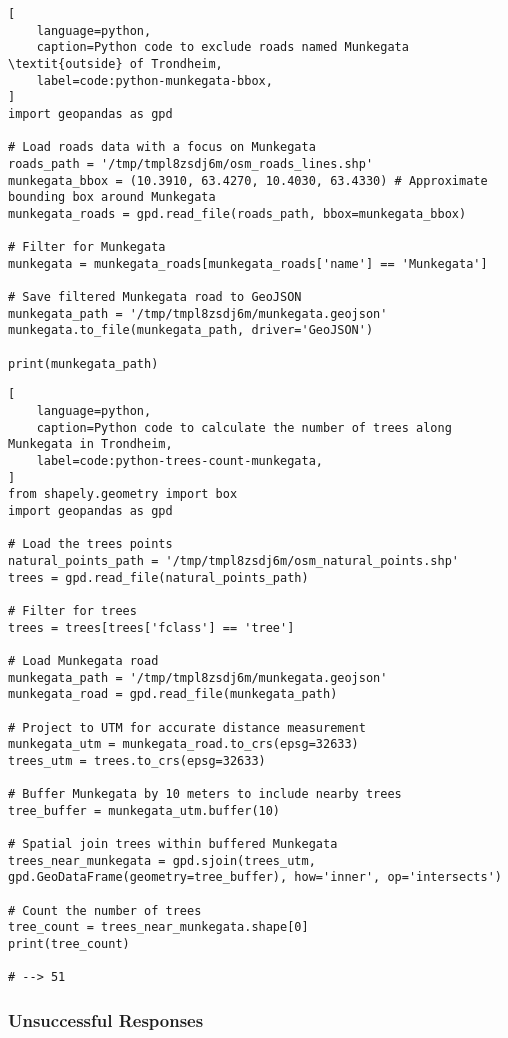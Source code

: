 \FloatBarrier

\begin{lstlisting}[
    language=python,
    caption=Python code to exclude roads named Munkegata \textit{outside} of Trondheim,
    label=code:python-munkegata-bbox,
]
import geopandas as gpd

# Load roads data with a focus on Munkegata
roads_path = '/tmp/tmpl8zsdj6m/osm_roads_lines.shp'
munkegata_bbox = (10.3910, 63.4270, 10.4030, 63.4330) # Approximate bounding box around Munkegata
munkegata_roads = gpd.read_file(roads_path, bbox=munkegata_bbox)

# Filter for Munkegata
munkegata = munkegata_roads[munkegata_roads['name'] == 'Munkegata']

# Save filtered Munkegata road to GeoJSON
munkegata_path = '/tmp/tmpl8zsdj6m/munkegata.geojson'
munkegata.to_file(munkegata_path, driver='GeoJSON')

print(munkegata_path)
\end{lstlisting}

\begin{lstlisting}[
    language=python,
    caption=Python code to calculate the number of trees along Munkegata in Trondheim,
    label=code:python-trees-count-munkegata,
]
from shapely.geometry import box
import geopandas as gpd

# Load the trees points
natural_points_path = '/tmp/tmpl8zsdj6m/osm_natural_points.shp'
trees = gpd.read_file(natural_points_path)

# Filter for trees
trees = trees[trees['fclass'] == 'tree']

# Load Munkegata road
munkegata_path = '/tmp/tmpl8zsdj6m/munkegata.geojson'
munkegata_road = gpd.read_file(munkegata_path)

# Project to UTM for accurate distance measurement
munkegata_utm = munkegata_road.to_crs(epsg=32633)
trees_utm = trees.to_crs(epsg=32633)

# Buffer Munkegata by 10 meters to include nearby trees
tree_buffer = munkegata_utm.buffer(10)

# Spatial join trees within buffered Munkegata
trees_near_munkegata = gpd.sjoin(trees_utm, gpd.GeoDataFrame(geometry=tree_buffer), how='inner', op='intersects')

# Count the number of trees
tree_count = trees_near_munkegata.shape[0]
print(tree_count)

# --> 51
\end{lstlisting}

\FloatBarrier
\subsubsection{Unsuccessful Responses}

